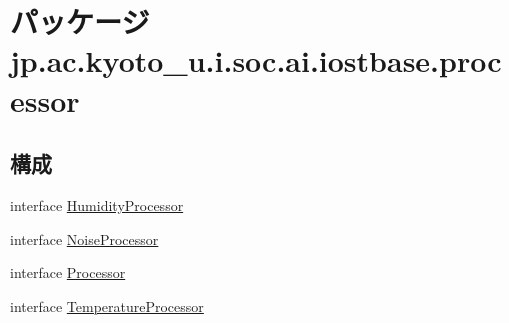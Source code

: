 \hypertarget{namespacejp_1_1ac_1_1kyoto__u_1_1i_1_1soc_1_1ai_1_1iostbase_1_1processor}{\section{パッケージ jp.\-ac.\-kyoto\-\_\-u.\-i.\-soc.\-ai.\-iostbase.\-processor}
\label{namespacejp_1_1ac_1_1kyoto__u_1_1i_1_1soc_1_1ai_1_1iostbase_1_1processor}
}
\subsection*{構成}
\begin{DoxyCompactItemize}
\item 
interface \hyperlink{interfacejp_1_1ac_1_1kyoto__u_1_1i_1_1soc_1_1ai_1_1iostbase_1_1processor_1_1_humidity_processor}{Humidity\-Processor}
\item 
interface \hyperlink{interfacejp_1_1ac_1_1kyoto__u_1_1i_1_1soc_1_1ai_1_1iostbase_1_1processor_1_1_noise_processor}{Noise\-Processor}
\item 
interface \hyperlink{interfacejp_1_1ac_1_1kyoto__u_1_1i_1_1soc_1_1ai_1_1iostbase_1_1processor_1_1_processor}{Processor}
\item 
interface \hyperlink{interfacejp_1_1ac_1_1kyoto__u_1_1i_1_1soc_1_1ai_1_1iostbase_1_1processor_1_1_temperature_processor}{Temperature\-Processor}
\end{DoxyCompactItemize}

